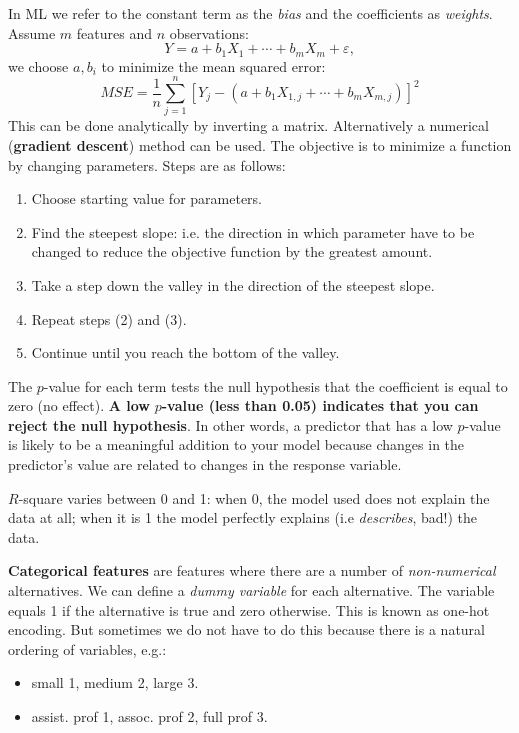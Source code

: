 In ML we refer to the constant term as the \textit{bias} and the coefficients as \textit{weights}. Assume $m$ features and $n$ observations:
\begin{equation*}
    Y=a+b_{1} X_{1} +\cdots +b_{m} X_{m} +\varepsilon,
\end{equation*}
we choose $a,b_{i}$ to minimize the mean squared error:
\begin{equation*}
    MSE=\frac{1}{n}\sum _{j=1}^{n}[ Y_{j} -(a+b_{1} X_{1,j} +\cdots +b_{m} X_{m,j})]^{2}
\end{equation*}
This can be done analytically by inverting a matrix. Alternatively a numerical (\textbf{gradient descent}) method can be used. The objective is to minimize a function by changing parameters. Steps are as follows:
\begin{enumerate}
    \item Choose starting value for parameters.
    \item Find the steepest slope: i.e. the direction in which parameter have to be changed to reduce the objective function by the greatest amount.
    \item Take a step down the valley in the direction of the steepest slope.
    \item Repeat steps (2) and (3).
    \item Continue until you reach the bottom of the valley.
\end{enumerate}

The $p$-value for each term tests the null hypothesis that the coefficient is equal to zero (no effect). \textbf{A low }$p$\textbf{-value (less than 0.05) indicates that you can reject the null hypothesis}. In other words, a predictor that has a low $p$-value is likely to be a meaningful addition to your model because changes in the predictor's value are related to changes in the response variable.

$R$-square varies between 0 and 1: when 0, the model used does not explain the data at all; when it is 1 the model perfectly explains (i.e \textit{describes}, bad!) the data. 

\textbf{Categorical features} are features where there are a number of \textit{non-numerical} alternatives. We can define a \textit{dummy variable} for each alternative. The variable equals 1 if the alternative is true and zero otherwise. This is known as one-hot encoding. But sometimes we do not have to do this because there is a natural ordering of variables, e.g.:
\begin{itemize}
    \item small 1, medium 2, large 3.
    \item assist. prof 1, assoc. prof 2, full prof 3.
\end{itemize}

